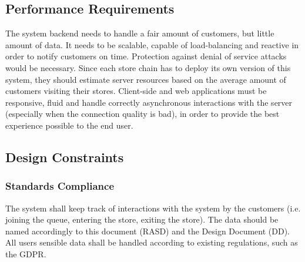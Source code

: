 \subsection{Performance Requirements}
The system backend needs to handle a fair amount of customers, but little amount of data. It needs to be scalable, capable of load-balancing and reactive in order to notify customers on time. Protection against denial of service attacks would be necessary.
Since each store chain has to deploy its own version of this system, they should estimate server resources based on the average amount of customers visiting their stores.
Client-side and web applications must be responsive, fluid and handle correctly asynchronous interactions with the server (especially when the connection quality is bad), in order to provide the best experience possible to the end user.

\subsection{Design Constraints}
\subsubsection{Standards Compliance}
The system shall keep track of interactions with the system by the customers (i.e. joining the queue, entering the store, exiting the store).
The data should be named accordingly to this document (RASD) and the Design Document (DD).
All users sensible data shall be handled according to existing regulations, such as the GDPR.

